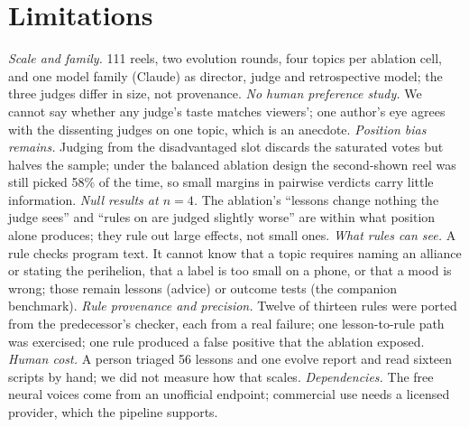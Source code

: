 \documentclass[11pt]{article}
\begin{document}
\section{Limitations}
\label{sec:limits}
\emph{Scale and family.} 111 reels, two evolution rounds, four topics per ablation cell, and one
model family (Claude) as director, judge and retrospective model; the three judges differ in size, not
provenance. \emph{No human preference study.} We cannot say whether any judge's taste matches viewers';
one author's eye agrees with the dissenting judges on one topic, which is an anecdote. \emph{Position
bias remains.} Judging from the disadvantaged slot discards the saturated votes but halves the sample;
under the balanced ablation design the second-shown reel was still picked 58\% of the time, so small
margins in pairwise verdicts carry little information. \emph{Null results at $n=4$.} The
ablation's ``lessons change nothing the judge sees'' and ``rules on are judged slightly worse'' are
within what position alone produces; they rule out large effects, not small ones. \emph{What rules can
see.} A rule checks program text. It cannot know that a topic requires naming an alliance or stating
the perihelion, that a label is too small on a phone, or that a mood is wrong; those remain lessons
(advice) or outcome tests (the companion benchmark). \emph{Rule provenance and precision.} Twelve of
thirteen rules were ported from the predecessor's checker, each from a real failure; one
lesson-to-rule path was exercised; one rule produced a false positive that the ablation exposed.
\emph{Human cost.} A person triaged 56 lessons and one evolve report and read sixteen scripts by
hand; we did not measure how that scales. \emph{Dependencies.} The free neural voices come from an
unofficial endpoint; commercial use needs a licensed provider, which the pipeline supports.
\end{document}
